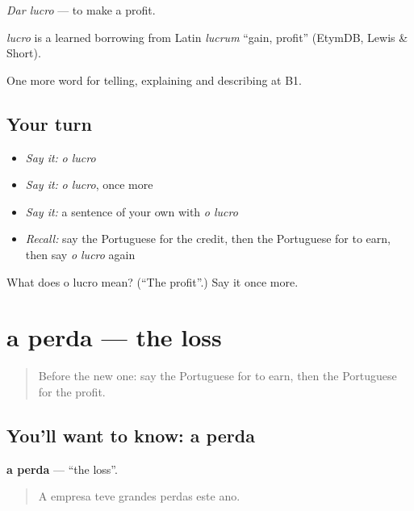 \emph{Dar lucro} — to make a profit.

\begin{cousinweb}
\emph{lucro} is a learned borrowing from Latin \emph{lucrum} \textquotedblleft{}gain, profit\textquotedblright{} (EtymDB, Lewis \& Short).
\end{cousinweb}

\begin{grammarlens}[title={What you've built}]
One more word for telling, explaining and describing at B1.
\end{grammarlens}

\subsection*{Your turn}
\begin{itemize}
\raggedright
  \item \emph{Say it:} \emph{o lucro}
  \item \emph{Say it:} \emph{o lucro}, once more
  \item \emph{Say it:} a sentence of your own with \emph{o lucro}
  \item \emph{Recall:} say the Portuguese for the credit, then the Portuguese for to earn, then say \emph{o lucro} again
\end{itemize}

\begin{tcolorbox}[breakable,colback=teal!4,colframe=teal!35!black,title={Before you move on}]
What does o lucro mean? (\textquotedblleft{}The profit\textquotedblright{}.) Say it once more.
\end{tcolorbox}
\section[a perda]{a perda — the loss}

\label{lesson:PT-C395-perda}



\begin{quote}
Before the new one: say the Portuguese for to earn, then the Portuguese for the profit.
\end{quote}

\subsection*{You'll want to know: a perda}
\textbf{a perda} — \textquotedblleft{}the loss\textquotedblright{}.

\begin{quote}
A empresa teve grandes perdas este ano.
\end{quote}

